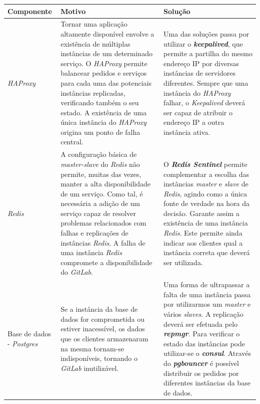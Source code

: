 \documentclass[12pt,a4paper]{article}
\begin{document}
\begin{center}
\small
\begin{longtable}{|p{}|p{}|p{}|}
    \hline
    \textbf{Componente} & \textbf{Motivo} & \textbf{Solução} \\ \hline
    
    \textit{HAProxy} & Tornar uma aplicação altamente disponível envolve a existência de múltiplas instâncias de um determinado serviço. O \emph{HAProxy} permite balancear pedidos e serviços para cada uma das potenciais instâncias replicadas, verificando também o  seu estado. A existência de uma única instância do \emph{HAProxy} origina um ponto de falha central. & Uma das soluções passa por utilizar o \textbf{\textit{keepalived}}, que permite a partilha do mesmo endereço IP por diversas instâncias de servidores diferentes. Sempre que uma instância do \emph{HAProxy} falhar, o \textit{Keepalived} deverá ser capaz de atribuir o endereço IP a outra instância ativa.  \\ \hline
    
    \emph{Redis} & A configuração básica de \emph{master-slave} do \emph{Redis} não permite, muitas das vezes, manter a alta disponibilidade de um serviço. Como tal, é necessária a adição de um serviço capaz de resolver problemas relacionados com falhas e replicações de instâncias \emph{Redis}. A falha de uma instância \emph{Redis} compromete a disponibilidade do \emph{GitLab}. & O \textbf{\emph{Redis Sentinel}} permite complementar a escolha das instâncias \emph{master} e \emph{slave} de  \emph{Redis}, agindo como a única fonte de verdade na hora da decisão. Garante assim a existência de uma instância \emph{Redis}.  Este permite ainda indicar aos clientes qual a instância correta que deverá ser utilizada.   \\ \hline
    
    Base de dados - \emph{Postgres} & Se a instância da base de dados for comprometida ou estiver inacessível, os dados que os clientes armazenaram na mesma tornam-se indisponíveis, tornando o \emph{GitLab} inutilizável. & Uma forma de ultrapassar a falta de uma instância passa por utilizarmos um \emph{master} e vários \emph{slaves}. A replicação deverá ser efetuada pelo \textbf{\emph{repmgr}}. Para verificar o estado das instâncias pode utilizar-se o \textbf{\emph{consul}}. Através do \textbf{\emph{pgbouncer}} é possível distribuir os pedidos por diferentes instâncias da base de dados. \\ \hline
    

\end{longtable}
\end{center}
\end{document}
